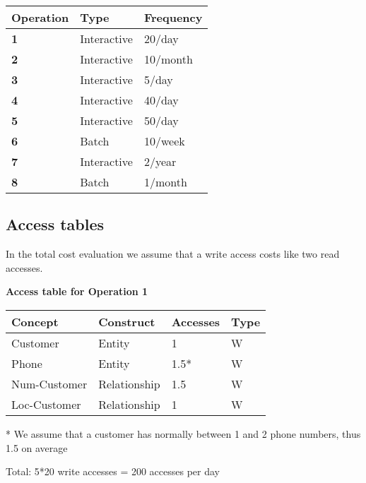 \begin{table}[H]
  \def\arraystretch{1.25}%
  \centering
  \begin{tabular}{ | m{2.5cm} | m{3.5cm}| m{3.5cm} |}
    \hline
    {\textbf{\large Operation}} & {\textbf{\large Type}} & {\textbf{\large Frequency}} \\
    \hline
    \color[HTML]{3531FF} \textbf{1} & Interactive & 20/day  \\
    \hline
    \color[HTML]{3531FF} \textbf{2} & Interactive & 10/month  \\
    \hline
    \color[HTML]{3531FF} \textbf{3} & Interactive & 5/day  \\
    \hline
    \color[HTML]{3531FF} \textbf{4} & Interactive & 40/day  \\
    \hline
    \color[HTML]{3531FF} \textbf{5} & Interactive & 50/day  \\
    \hline
    \color[HTML]{3531FF} \textbf{6} & Batch & 10/week  \\
    \hline
    \color[HTML]{3531FF} \textbf{7} & Interactive & 2/year  \\
    \hline
    \color[HTML]{3531FF} \textbf{8} & Batch & 1/month  \\
    \hline
  \end{tabular}
\end{table}

\pagebreak

\subsection{Access tables}

In the total cost evaluation we assume that a write access costs like two read accesses.

\vspace{12px}

{\centering \textbf{Access table for Operation 1}\\}
\begin{table}[H]
  \def\arraystretch{1.10}%
  \centering
  \begin{tabular}{ | m{4cm} | m{4cm}| m{3cm} | m{2cm} |}
    \hline
    {\textbf{\large Concept}} & {\textbf{\large Construct}} & {\textbf{\large Accesses}} & {\textbf{\large Type}} \\
    \hline
    \color[HTML]{3531FF} Customer & Entity & 1 & W \\
    \hline
    \color[HTML]{3531FF} Phone & Entity & 1.5* & W \\
    \hline
    \color[HTML]{3531FF} Num-Customer & Relationship & 1.5 & W \\
    \hline
    \color[HTML]{3531FF} Loc-Customer & Relationship & 1 & W \\
    \hline
  \end{tabular}
  * \small{We assume that a customer has normally between 1 and 2 phone numbers, thus 1.5 on average}
\end{table}
Total: 5*20 write accesses = 200 accesses per day

